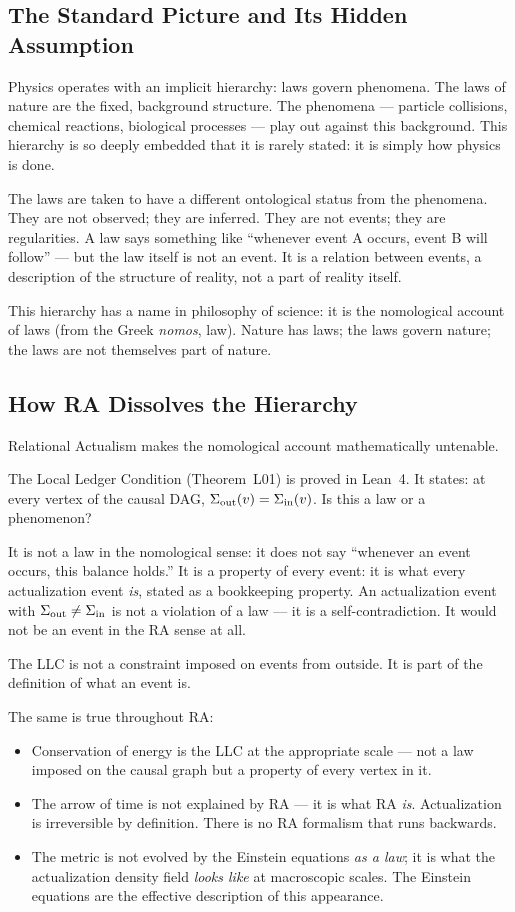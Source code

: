 \documentclass[12pt,a4paper]{article}
\begin{document}
\subsection{The Standard Picture and Its Hidden Assumption}

Physics operates with an implicit hierarchy: laws govern phenomena.  The laws of nature are the fixed, background structure.  The phenomena --- particle collisions, chemical reactions, biological processes --- play out against this background.  This hierarchy is so deeply embedded that it is rarely stated: it is simply how physics is done.

The laws are taken to have a different ontological status from the phenomena.  They are not observed; they are inferred.  They are not events; they are regularities.  A law says something like ``whenever event A occurs, event B will follow'' --- but the law itself is not an event.  It is a relation between events, a description of the structure of reality, not a part of reality itself.

This hierarchy has a name in philosophy of science: it is the nomological account of laws (from the Greek \textit{nomos}, law).  Nature has laws; the laws govern nature; the laws are not themselves part of nature.

\subsection{How RA Dissolves the Hierarchy}

Relational Actualism makes the nomological account mathematically untenable.

The Local Ledger Condition (Theorem~L01) is proved in Lean~4.  It states: at every vertex of the causal DAG, $\Sigma_{\rm out}(v)=\Sigma_{\rm in}(v)$.  Is this a law or a phenomenon?

It is not a law in the nomological sense: it does not say ``whenever an event occurs, this balance holds.''  It is a property of every event: it is what every actualization event \emph{is}, stated as a bookkeeping property.  An actualization event with $\Sigma_{\rm out}\neq\Sigma_{\rm in}$ is not a violation of a law --- it is a self-contradiction.  It would not be an event in the RA sense at all.

The LLC is not a constraint imposed on events from outside.  It is part of the definition of what an event is.

The same is true throughout RA:
\begin{itemize}
  \item Conservation of energy is the LLC at the appropriate scale --- not a law imposed on the causal graph but a property of every vertex in it.
  \item The arrow of time is not explained by RA --- it is what RA \emph{is}.  Actualization is irreversible by definition.  There is no RA formalism that runs backwards.
  \item The metric is not evolved by the Einstein equations \emph{as a law}; it is what the actualization density field \emph{looks like} at macroscopic scales.  The Einstein equations are the effective description of this appearance.
\end{itemize}
\end{document}
